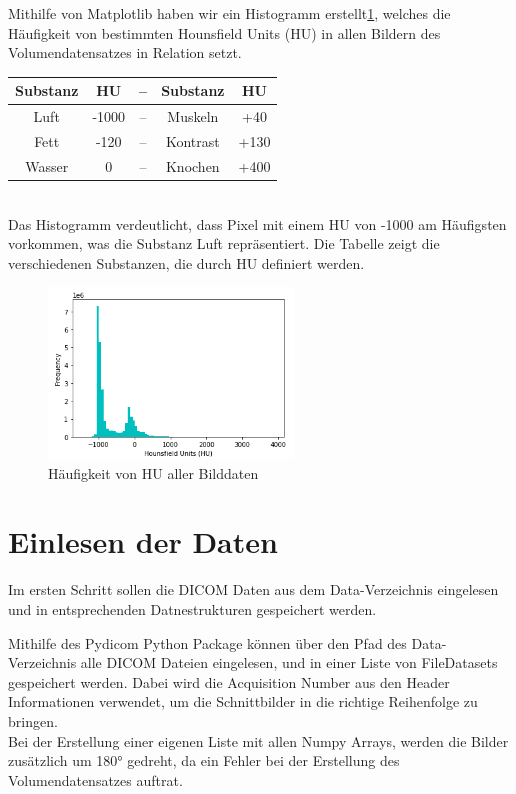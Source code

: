 \documentclass[conference]{IEEEtran}
\begin{document}
Mithilfe von Matplotlib haben wir ein Histogramm erstellt\ref{slice_hist}, welches die Häufigkeit von bestimmten Hounsfield Units (HU) in allen Bildern des Volumendatensatzes in Relation setzt. \\

\begin{tabular}{|c|c|c|c|c|}		
		\hline
		\textbf{Substanz} & \textbf{HU} & \textbf{--} & \textbf{Substanz} & \textbf{HU}\\
		\hline
		Luft & -1000 & -- & Muskeln & +40\\
		\hline
		Fett & -120 & -- & Kontrast & +130\\
		\hline
		Wasser & 0 & -- & Knochen & +400\\
		\hline
	\end{tabular}\\


Das Histogramm verdeutlicht, dass Pixel mit einem HU von -1000 am Häufigsten vorkommen, was die Substanz Luft repräsentiert. Die Tabelle zeigt die verschiedenen Substanzen, die durch HU definiert werden.

\begin{figure}[H]
	\begin{center}
		\includegraphics[width=6.5cm]{latex/images/slices_hist.png}
	 	\caption{Häufigkeit von HU aller Bilddaten}
	 	\label{slice_hist}
	\end{center}
\end{figure}

\section{Einlesen der Daten}
Im ersten Schritt sollen die DICOM Daten aus dem Data-Verzeichnis eingelesen und in entsprechenden Datnestrukturen gespeichert werden.

Mithilfe des Pydicom Python Package\cite{pydicom} können über den Pfad des Data-Verzeichnis alle DICOM Dateien eingelesen, und in einer Liste von FileDatasets gespeichert werden. Dabei wird die Acquisition Number aus den Header Informationen verwendet, um die Schnittbilder in die richtige Reihenfolge zu bringen. \\
Bei der Erstellung einer eigenen Liste mit allen Numpy Arrays, werden die Bilder zusätzlich um 180° gedreht, da ein Fehler bei der Erstellung des Volumendatensatzes auftrat.
\end{document}
